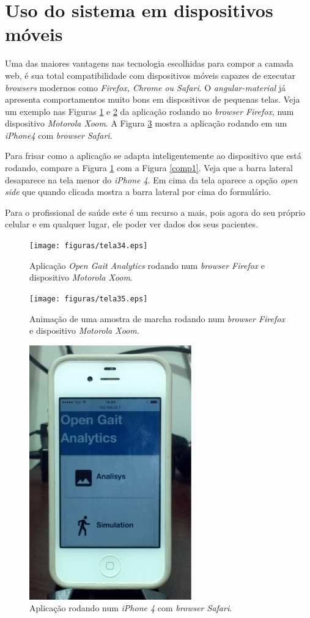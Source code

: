 \goodbreak
\newpage
\clearpage
\section{Uso do sistema em dispositivos móveis}
Uma das maiores vantagens nas tecnologia escolhidas para compor a camada web, é sua total compatibilidade com dispositivos móveis capazes de executar \emph{browsers} modernos como \emph{Firefox, Chrome ou Safari}. O \emph{angular-material} já apresenta comportamentos muito bons em dispositivos de pequenas telas. 
Veja um exemplo nas Figuras \ref{tela34} e \ref{tela35} da aplicação rodando no \emph{browser} \emph{Firefox}, num dispositivo \emph{Motorola Xoom}. A Figura \ref{tela36} mostra a aplicação rodando em um \emph{iPhone4} com \emph{browser Safari}.

Para frisar como a aplicação se adapta inteligentemente ao dispositivo que está rodando, compare a Figura \ref{tela34} com a Figura \ref{comp1}. 
Veja que a barra lateral desaparece na tela menor do \emph{iPhone 4}. Em cima da tela aparece a opção \emph{open side} que quando clicada mostra a barra lateral por cima do formulário.

Para o profissional de saúde este é um recurso a mais, pois agora do seu próprio celular e em qualquer lugar, ele poder ver dados dos seus pacientes.

\begin{figure}[ht]
	\centering
	\texttt{[image: figuras/tela34.eps]}
	\caption{Aplicação \emph{Open Gait Analytics} rodando num \emph{browser Firefox} e dispositivo \emph{Motorola Xoom}.}
\label{tela34}
\end{figure}

\begin{figure}[ht]
	\centering
	\texttt{[image: figuras/tela35.eps]}
	\caption{Animação de uma amostra de marcha rodando num \emph{browser Firefox} e dispositivo \emph{Motorola Xoom}.}
\label{tela35}
\end{figure}

\begin{figure}[ht]
	\centering
	\includegraphics[width=7cm]{figuras/tela36.eps}
	\caption{Aplicação rodando num \emph{iPhone 4} com \emph{browser Safari}.}
\label{tela36}
\end{figure}

